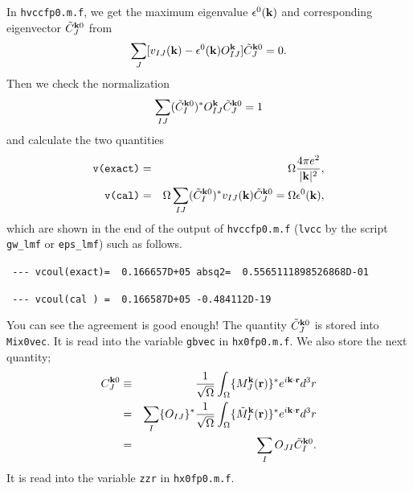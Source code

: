 \documentclass[a4paper,10pt,epsf,fleqn]{article}
\begin{document}
{{{\begin{thebibliography}{00}
In \verb|hvccfp0.m.f|, we get the maximum eigenvalue $\epsilon^0({\bf k})$ 
and corresponding eigenvector $\tilde{C}^{{\bf k}0}_J$ from 
\begin{eqnarray}
   \sum_J[v_{IJ}({\bf k}) - \epsilon^0({\bf k})
   O^{\bf k}_{IJ}] \tilde{C}^{{\bf k}0}_J=0.
\end{eqnarray}
Then we check the normalization
\begin{eqnarray}
  \sum_{IJ}( \tilde{C}^{{\bf k}0}_I )^* O_{IJ}^{\bf k}
              \tilde{C}^{{\bf k}0}_J = 1
\end{eqnarray}
and calculate the two quantities
\begin{eqnarray} 
   \verb|v(exact)|
    &=& \Omega \frac{4\pi e^2}{|{\bf k}|^2}, \\
   \verb|v(cal)| 
    &=& \Omega \sum_{IJ}( \tilde{C}^{{\bf k}0}_I )^*v_{IJ}({\bf k}) 
              \tilde{C}^{{\bf k}0}_J
     =  \Omega \epsilon^0({\bf k}),
\end{eqnarray}
which are shown in the end of the output of \verb|hvccfp0.m.f| 
(\verb|lvcc| by the script \verb|gw_lmf| or \verb|eps_lmf|) such as follows.

\vspace{\baselineskip}

\verb| --- vcoul(exact)=  0.166657D+05 absq2=  0.5565111898526868D-01|

\verb| --- vcoul(cal ) =  0.166587D+05 -0.484112D-19|

\vspace{\baselineskip}

You can see the agreement is good enough!
The quantity $\tilde{C}^{{\bf k}0}_J$ is stored into \verb|Mix0vec|.
It is read into the variable \verb|gbvec| in \verb|hx0fp0.m.f|.
We also store the next quantity;
\begin{eqnarray}
  C^{{\bf k}0}_J
  &\equiv& \frac{1}{\sqrt{\Omega}}\int_{\Omega}
     \{ M_J^{\bf k}({\bf r}) \}^* e^{i{\bf k \cdot r}}d^3r \nonumber \\
  &=& \sum_I \{ O_{IJ} \}^* \frac{1}{\sqrt{\Omega}}\int_{\Omega}
     \{ \tilde{M}_I^{\bf k}({\bf r}) \}^* e^{i{\bf k \cdot r}}d^3r \nonumber \\
  &=& \sum_I O_{JI} \tilde{C}^{{\bf k}0}_I.
\end{eqnarray}
It is read into the variable \verb|zzr| in \verb|hx0fp0.m.f|.




\end{thebibliography}}}}
\end{document}
